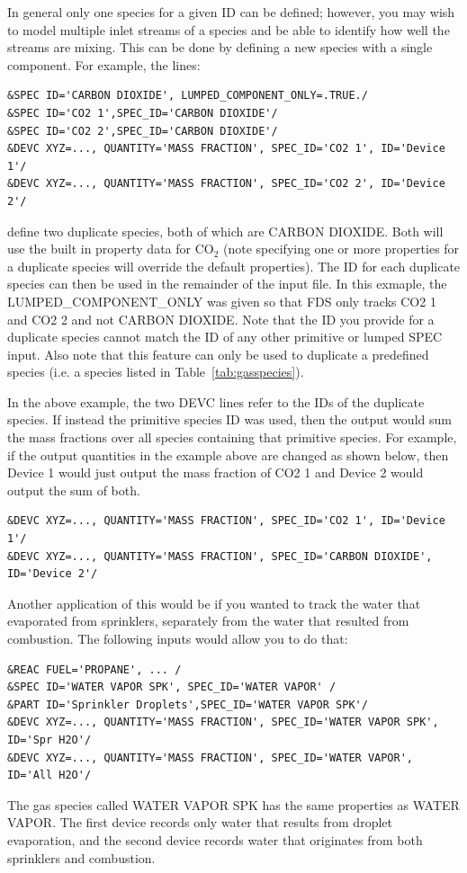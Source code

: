 \documentclass[11pt]{book}
\begin{document}
In general only one species for a given {\ct ID} can be defined; however, you may wish to model multiple inlet streams of a species and be able to identify how well the streams are mixing.  This can be done by defining a new species with a single component.  For example, the lines:
\begin{lstlisting}
&SPEC ID='CARBON DIOXIDE', LUMPED_COMPONENT_ONLY=.TRUE./
&SPEC ID='CO2 1',SPEC_ID='CARBON DIOXIDE'/
&SPEC ID='CO2 2',SPEC_ID='CARBON DIOXIDE'/
&DEVC XYZ=..., QUANTITY='MASS FRACTION', SPEC_ID='CO2 1', ID='Device 1'/
&DEVC XYZ=..., QUANTITY='MASS FRACTION', SPEC_ID='CO2 2', ID='Device 2'/
\end{lstlisting}
define two duplicate species, both of which are {\ct CARBON DIOXIDE}.  Both will use the built in property data for CO$_2$ (note specifying one or more properties for a duplicate species will override the default properties).  The {\ct ID} for each duplicate species can then be used in the remainder of the input file.  In this exmaple, the {\ct LUMPED\_COMPONENT\_ONLY} was given so that FDS only tracks {\ct CO2 1} and {\ct CO2 2} and not {\ct CARBON DIOXIDE}.  Note that the {\ct ID} you provide for a duplicate species cannot match the {\ct ID} of any other primitive or lumped {\ct SPEC} input.  Also note that this feature can only be used to duplicate a predefined species (i.e. a species listed in Table~\ref{tab:gasspecies}).

In the above example, the two {\ct DEVC} lines refer to the {\ct ID}s of the duplicate species.  If instead the primitive species {\ct ID} was used, then the output would sum the mass fractions over all species containing that primitive species.  For example, if the output quantities in the example above are changed as shown below, then {\ct Device 1} would just output the mass fraction of {\ct CO2 1} and {\ct Device 2} would output the sum of both.
\begin{lstlisting}
&DEVC XYZ=..., QUANTITY='MASS FRACTION', SPEC_ID='CO2 1', ID='Device 1'/
&DEVC XYZ=..., QUANTITY='MASS FRACTION', SPEC_ID='CARBON DIOXIDE', ID='Device 2'/
\end{lstlisting}
Another application of this would be if you wanted to track the water that evaporated from sprinklers, separately from the water
that resulted from combustion.  The following inputs would allow you to do that:
\begin{lstlisting}
&REAC FUEL='PROPANE', ... /
&SPEC ID='WATER VAPOR SPK', SPEC_ID='WATER VAPOR' /
&PART ID='Sprinkler Droplets',SPEC_ID='WATER VAPOR SPK'/
&DEVC XYZ=..., QUANTITY='MASS FRACTION', SPEC_ID='WATER VAPOR SPK', ID='Spr H2O'/
&DEVC XYZ=..., QUANTITY='MASS FRACTION', SPEC_ID='WATER VAPOR', ID='All H2O'/
\end{lstlisting}
The gas species called {\ct WATER VAPOR SPK} has the same properties as {\ct WATER VAPOR}. The first device records only water that results from droplet evaporation, and the second device records water that originates from both sprinklers and combustion.
\end{document}
